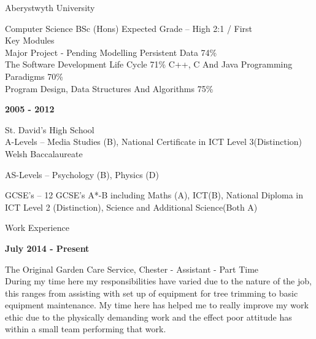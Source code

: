\documentclass[10pt,a4paper]{article}
\begin{document}
\begin{center}
Aberystwyth University\\
\vspace{0.1cm}

Computer Science BSc (Hons) Expected Grade – High 2:1 / First\\
Key Modules \\
\vspace{0.2cm}
Major Project - Pending \hspace{3cm} Modelling Persistent Data 74\%\\
\vspace{0.2cm}
The Software Development Life Cycle 71\% \hspace{0.2cm} C++, C And Java Programming Paradigms 70\%\\
\vspace{0.2cm}
Program Design, Data Structures And Algorithms 75\%
\end{center}
\noindent
\large
\newpage
\textbf{2005 - 2012}\\
\normalsize

\begin{center}
St. David's High School\\
\vspace{0.1cm}
A-Levels – Media Studies (B), National Certificate in ICT Level 3(Distinction)\\ Welsh Baccalaureate

AS-Levels – Psychology (B), Physics (D)

GCSE’s – 12 GCSE’s A*-B including Maths (A), ICT(B), National Diploma in ICT Level 2 (Distinction), Science and Additional Science(Both A)\\

\end{center}

\Large	
\noindent
Work Experience\\

\normalsize

\noindent 
\textbf{July 2014 - Present}
\normalsize

\noindent
The Original Garden Care Service, Chester - Assistant - Part Time\\

\noindent
During my time here my responsibilities have varied due to the nature of the job, this ranges from assisting with set up of equipment for tree trimming to basic equipment maintenance. My time here has helped me to really improve my work ethic due to the physically demanding work and the effect poor attitude has within a small team performing that work. \\
\end{document}
